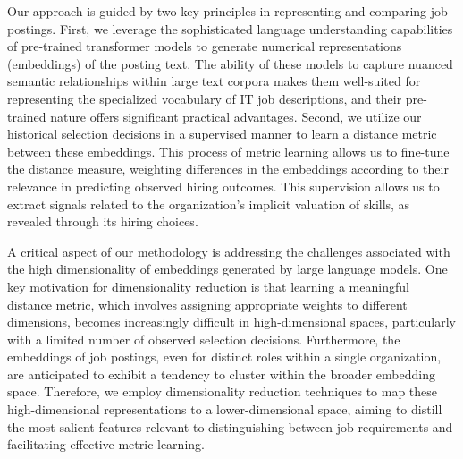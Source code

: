 Our approach is guided by two key principles in representing and comparing job postings. First, we leverage 
the sophisticated language understanding capabilities of pre-trained transformer models to generate numerical 
representations (embeddings) of the posting text. The ability of these models to capture nuanced semantic 
relationships within large text corpora makes them well-suited for representing the specialized vocabulary 
of IT job descriptions, and their pre-trained nature offers significant practical advantages. Second, we 
utilize our historical selection decisions in a supervised manner to learn a distance metric between these embeddings. 
This process of metric learning allows us to fine-tune the distance measure, weighting differences in the 
embeddings according to their relevance in predicting observed hiring outcomes. This supervision allows us to 
extract signals related to the organization's implicit valuation of skills, as revealed through its hiring choices.


A critical aspect of our methodology is addressing the challenges associated with the high dimensionality of embeddings 
generated by large language models. One key motivation for dimensionality reduction is that learning a meaningful distance 
metric, which involves assigning appropriate weights to different dimensions, becomes increasingly difficult in 
high-dimensional spaces, particularly with a limited number of observed selection decisions. Furthermore, the 
embeddings of job postings, even for distinct roles within a single organization, are anticipated to exhibit a 
tendency to cluster within the broader embedding space. Therefore, we employ dimensionality reduction techniques 
to map these high-dimensional representations to a lower-dimensional space, aiming to distill the most salient 
features relevant to distinguishing between job requirements and facilitating effective metric learning.


